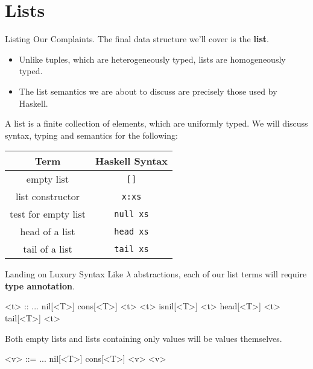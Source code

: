 \documentclass[11pt]{beamer}
\begin{document}
\section[Lists]{Lists}
\begin{frame}[fragile=singleslide]{Listing Our Complaints.}
The final data structure we'll cover is the \textbf{list}.
\begin{itemize}
\item Unlike tuples, which are heterogeneously typed, lists are homogeneously typed.
\item The list semantics we are about to discuss are precisely those used by Haskell.
\end{itemize}
A list is a finite collection of elements, which are uniformly typed.  We will discuss syntax, typing and semantics for the following:
\begin{center}

\begin{tabular}{| c | c |}
\hline
Term & Haskell Syntax \\ \hline
empty list & \texttt{[]} \\ \hline
list constructor & \texttt{x:xs} \\ \hline
test for empty list & \texttt{null xs} \\ \hline
head of a list & \texttt{head xs} \\ \hline
tail of a list & \texttt{tail xs} \\ \hline
\end{tabular}

\end{center}

\end{frame}


\begin{frame}[fragile=singleslide]{Landing on Luxury Syntax}
Like $\lambda$ abstractions, each of our list terms will require \textbf{type annotation}.
\begin{grammar}
<t> :: ...
\alt nil[<T>]
\alt cons[<T>] <t> <t>
\alt isnil[<T>] <t>
\alt head[<T>] <t>
\alt tail[<T>] <t> 
\end{grammar}
Both empty lists and lists containing only values will be values themselves.
\begin{grammar}
<v> ::= ...
\alt nil[<T>]
\alt cons[<T>] <v> <v>
\end{grammar}
\end{frame}
\end{document}
